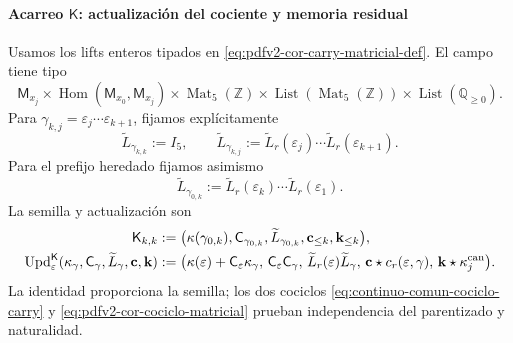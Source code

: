 \paragraph{Acarreo \(\mathsf K\): actualización del cociente y memoria residual}
Usamos los lifts enteros tipados en
\eqref{eq:pdfv2-cor-carry-matricial-def}. El campo tiene tipo
\[
 \mathsf M_{x_j}\times
 \operatorname{Hom}(\mathsf M_{x_0},\mathsf M_{x_j})
 \times\operatorname{Mat}_5(\mathbb Z)
 \times\operatorname{List}(\operatorname{Mat}_5(\mathbb Z))
 \times\operatorname{List}(\mathbb Q_{\geq0}).
\]
Para \(\gamma_{k,j}=\varepsilon_j\cdots\varepsilon_{k+1}\), fijamos
explícitamente
\begin{equation}
\label{eq:pdfv2-terminal-lift-entero-ruta}
 \widetilde L_{\gamma_{k,k}}:=I_5,\qquad
 \widetilde L_{\gamma_{k,j}}
 :=\widetilde L_r(\varepsilon_j)\cdots
   \widetilde L_r(\varepsilon_{k+1}).
\end{equation}
Para el prefijo heredado fijamos asimismo
\[
 \widetilde L_{\gamma_{0,k}}
 :=\widetilde L_r(\varepsilon_k)\cdots
   \widetilde L_r(\varepsilon_1).
\]
La semilla y actualización son
\begin{align}
 \mathsf K_{k,k}&:=
 \bigl(\kappa(\gamma_{0,k}),\mathsf C_{\gamma_{0,k}},
       \widetilde L_{\gamma_{0,k}},
       \mathbf c_{\leq k},\mathbf k_{\leq k}\bigr),
 \label{eq:pdfv2-terminal-semilla-k}\\
 \operatorname{Upd}^{\mathsf K}_{\varepsilon}
 (\kappa_\gamma,\mathsf C_\gamma,\widetilde L_\gamma,
   \mathbf c,\mathbf k)
 &:=
 \bigl(\kappa(\varepsilon)+\mathsf C_\varepsilon\kappa_\gamma,\,
 \mathsf C_\varepsilon\mathsf C_\gamma,\,
 \widetilde L_r(\varepsilon)\widetilde L_\gamma,\,
 \mathbf c\star c_r(\varepsilon,\gamma),\,
 \mathbf k\star\kappa_j^{\rm can}\bigr).
 \label{eq:pdfv2-terminal-update-k}
\end{align}
La identidad proporciona la semilla; los dos cociclos
\eqref{eq:continuo-comun-cociclo-carry} y
\eqref{eq:pdfv2-cor-cociclo-matricial} prueban independencia del
parentizado y naturalidad.

